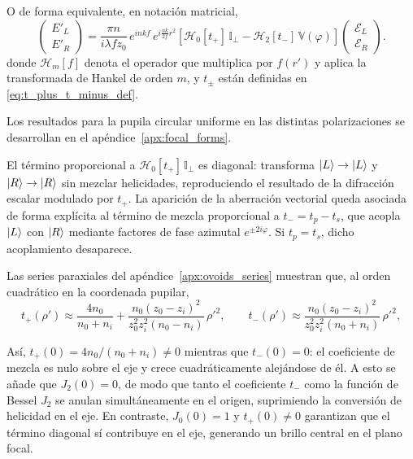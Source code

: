 O de forma equivalente, en notación matricial,
\begin{equation}
\boxed{
\begin{pmatrix} E'_L \\ E'_R \end{pmatrix}
=
\frac{\pi n}{i\lambda f z_0}\,e^{inkf}\,e^{i\frac{nk}{2f}r^2}
\left[
\mathscr H_0[t_+]\,\mathbb I_\perp
-
\mathscr H_2[t_-]\,\mathbb V(\varphi)
\right]
\begin{pmatrix} \mathscr E_L \\ \mathscr E_R \end{pmatrix}.
}
\label{eq:E_L_E_R_Hankel_matrix}
\end{equation}
donde $\mathscr H_m[f]$ denota el operador que multiplica por $f(r')$ y aplica la transformada de Hankel de orden $m$, y $t_\pm$ están definidas en \eqref{eq:t_plus_t_minus_def}.

Los resultados para la pupila circular uniforme en las distintas polarizaciones se desarrollan en el apéndice~\ref{apx:focal_forms}.

El término proporcional a $\mathscr{H}_0[t_+]\,\mathbb{I}_\perp$ es diagonal: transforma $\ket{L}\to\ket{L}$ y $\ket{R}\to\ket{R}$ sin mezclar helicidades, reproduciendo el resultado de la difracción escalar modulado por $t_+$. La aparición de la aberración vectorial queda asociada de forma explícita al término de mezcla proporcional a $t_-=t_p-t_s$, que acopla $\ket{L}$ con $\ket{R}$ mediante factores de fase azimutal $e^{\pm 2i\varphi}$. Si $t_p=t_s$, dicho acoplamiento desaparece.

Las series paraxiales del apéndice~\ref{apx:ovoids_series} muestran que, al orden cuadrático en la coordenada pupilar,
\begin{equation}
t_+(\rho')
\approx
\frac{4n_0}{n_0+n_i}
+
\frac{
n_0(z_0-z_i)^2
}{
z_0^2z_i^2(n_0-n_i)
}\,\rho'^2,
\qquad
t_-(\rho')
\approx
\frac{
n_0(z_0-z_i)^2
}{
z_0^2z_i^2(n_0+n_i)
}\,\rho'^2,
\label{eq:t_plus_t_minus_paraxial_second_order}
\end{equation}

Así, $t_+(0)=4n_0/(n_0+n_i)\neq 0$ mientras que $t_-(0)=0$: el coeficiente de mezcla es nulo sobre el eje y crece cuadráticamente alejándose de él. A esto se añade que $J_2(0)=0$, de modo que tanto el coeficiente $t_-$ como la función de Bessel $J_2$ se anulan simultáneamente en el origen, suprimiendo la conversión de helicidad en el eje. En contraste, $J_0(0)=1$ y $t_+(0)\neq 0$ garantizan que el término diagonal sí contribuye en el eje, generando un brillo central en el plano focal.

